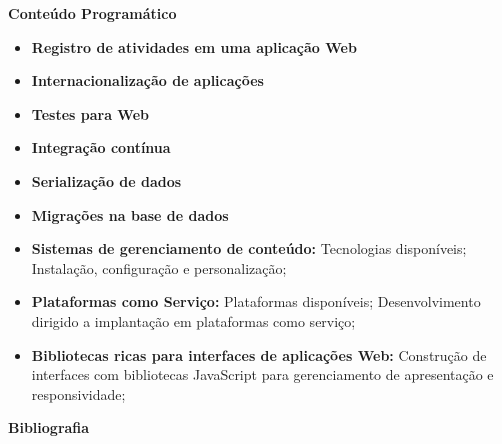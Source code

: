 
\begin{snugshade}\begin{center}\textbf{
    Conteúdo Programático
}\end{center}\end{snugshade}

\begin{itemize}

\item \textbf{Registro de atividades em uma aplicação Web}
\item \textbf{Internacionalização de aplicações}
\item \textbf{Testes para Web}
\item \textbf{Integração contínua}
\item \textbf{Serialização de dados}
\item \textbf{Migrações na base de dados}
\item \textbf{Sistemas de gerenciamento de conteúdo:}
    Tecnologias disponíveis; Instalação, configuração e personalização;
\item \textbf{Plataformas como Serviço:}
    Plataformas disponíveis; Desenvolvimento dirigido a implantação em plataformas como serviço;
\item \textbf{Bibliotecas ricas para interfaces de aplicações Web:}
    Construção de interfaces com bibliotecas JavaScript para gerenciamento de apresentação e responsividade;

\end{itemize}


%
%
%


\begin{snugshade}\begin{center}\textbf{
    Bibliografia
}\end{center}\end{snugshade}

